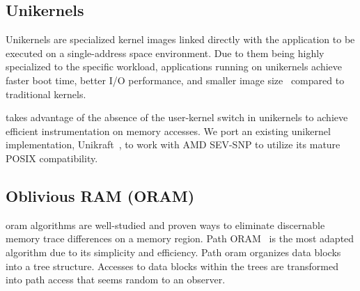 




\subsection{Unikernels}
Unikernels are specialized kernel images linked directly with the application to be executed on a single-address space environment. Due to them being highly specialized to the specific workload, applications running on unikernels achieve faster boot time, better I/O performance, and smaller image size~\cite{unikraft} compared to traditional kernels.


 \thename takes advantage of the absence of the user-kernel switch in unikernels to achieve efficient instrumentation on memory accesses.
We port an existing unikernel implementation, Unikraft~\cite{unikraft}, to work with AMD SEV-SNP to utilize its mature POSIX compatibility.


\subsection{Oblivious RAM (ORAM)}
\gls{oram} algorithms are well-studied and proven ways to eliminate discernable memory trace differences on a memory region.
Path ORAM~\cite{path-oram} is the most adapted algorithm due to its simplicity and efficiency.
Path \gls{oram} organizes data blocks into a tree structure. Accesses to data blocks within the trees are transformed into path access that seems random to an observer. 



